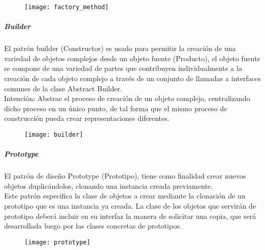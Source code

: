 \begin{figure}[h!]
  \centering{}
    \texttt{[image: factory\_method]}
\end{figure}
\subparagraph{Builder}
El patrón builder (Constructor) es usado para permitir la creación de una variedad de objetos complejos desde un objeto fuente (Producto), el objeto fuente se compone de una variedad de partes que contribuyen individualmente a la creación de cada objeto complejo a través de un conjunto de llamadas a interfaces comunes de la clase Abstract Builder.\\
Intención: Abstrae el proceso de creación de un objeto complejo, centralizando dicho proceso en un único punto, de tal forma que el mismo proceso de construcción pueda crear representaciones diferentes.\\
\begin{figure}[h!]
  \centering{}
    \texttt{[image: builder]}
\end{figure}
\subparagraph{Prototype}
El patrón de diseño Prototype (Prototipo), tiene como finalidad crear nuevos objetos duplicándolos, clonando una instancia creada previamente.\\
Este patrón especifica la clase de objetos a crear mediante la clonación de un prototipo que es una instancia ya creada. La clase de los objetos que servirán de prototipo deberá incluir en su interfaz la manera de solicitar una copia, que será desarrollada luego por las clases concretas de prototipos.
\begin{figure}[h!]
  \centering{}
    \texttt{[image: prototype]}
\end{figure}
\newpage
